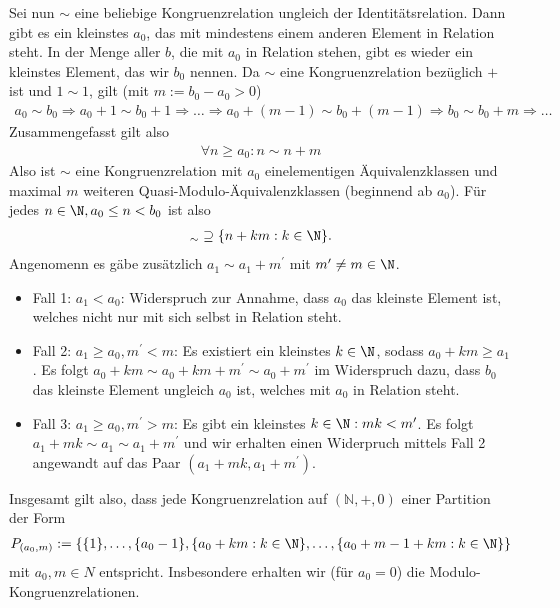 \begin{solution}
\begin{itemize}
Sei nun $\sim$ eine beliebige Kongruenzrelation ungleich der Identitätsrelation.
Dann gibt es ein kleinstes $a_{0}$, das mit mindestens einem anderen Element in Relation steht. In der Menge aller $b$, die mit $a_{0}$ in
Relation stehen, gibt es wieder ein kleinstes Element, das wir $b_{0}$ nennen. Da $\sim$ eine Kongruenzrelation bezüglich $+$ ist und $1
\sim 1$, gilt (mit $m := b_{0}-a_{0} > 0$)
\begin{align*}
  a_{0} \sim b_{0} \Rightarrow a_{0}+1 \sim b_{0}+1 \Rightarrow \dots \Rightarrow a_{0}+(m-1) \sim b_{0}+(m-1) \Rightarrow b_{0} \sim
  b_{0}+m \Rightarrow \dots
\end{align*}
Zusammengefasst gilt also
\begin{align*}
  \forall n \geq a_0: n \sim n + m
\end{align*}
Also ist $\sim$ eine Kongruenzrelation mit $a_{0}$ einelementigen Äquivalenzklassen und maximal $m$ weiteren Quasi-Modulo-Äquivalenzklassen
(beginnend ab $a_{0}$).
Für jedes $n \in \N,a_0 \leq n < b_0$ ist also
\begin{align*}
  [n]_{\sim} \supseteq \{n + km: k \in \N\}.
\end{align*}
Angenomenn es gäbe zusätzlich $a_1 \sim a_1 + m^{\prime}$ mit $m^{\prime} \neq m \in \N$. \\
\begin{itemize}
\item Fall 1: $a_1 < a_0$:
Widerspruch zur Annahme, dass $a_0$ das kleinste Element ist, welches nicht nur
mit sich selbst in Relation steht.
  \item Fall 2: $a_1 \geq a_0, m^{\prime} < m$:
  Es existiert ein kleinstes $k \in \N$, sodass $a_0 + km \geq a_1$.
  Es folgt $a_0 + km \sim a_0 + km + m^{\prime} \sim a_0 + m^{\prime}$
  im Widerspruch dazu, dass $b_0$ das kleinste Element ungleich $a_0$ ist, welches mit
  $a_0$ in Relation steht.
  \item Fall 3: $a_1 \geq a_0, m^{\prime} > m$:
  Es gibt ein kleinstes $k \in \N: mk < m^{\prime}$.
  Es folgt $a_1 + mk \sim a_1 \sim a_1 + m^{\prime}$ und wir erhalten einen
  Widerpruch mittels Fall 2 angewandt auf das Paar $(a_1 + mk, a_1 + m^{\prime})$.
\end{itemize}
Insgesamt gilt also, dass jede Kongruenzrelation auf $(\mathbb{N},+,0)$ einer Partition
der Form
\begin{align*}
  P_{(a_0,m)} := \{\{1\},\dots,\{a_0 - 1\},\{a_0 + km: k \in \N\},\dots,\{a_0 + m - 1 + km: k \in \N\}\}
\end{align*}
mit $a_0,m \in N$ entspricht. Insbesondere erhalten wir (für $a_0 = 0$) die Modulo-Kongruenzrelationen.

\end{itemize}
\end{solution}
